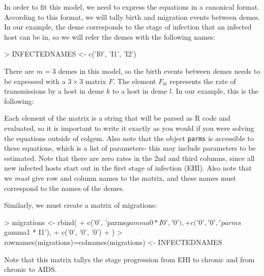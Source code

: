 \documentclass{article}
\begin{document}
In order to fit this model, we need to express the equations in a canonical format. 
According to this format, we will tally birth and migration events between demes. 
In our example, the deme corresponds to the stage of infection that an infected host can be in, so we will refer the demes with the following names:
\begin{Schunk}
\begin{Sinput}
> INFECTEDNAMES <- c('I0', 'I1', 'I2')
\end{Sinput}
\end{Schunk}

There are $m=3$ demes in this model, so the birth events between demes needs to be expressed with a $3\times 3$ matrix $F$. 
The element $F_{kl}$ represents the rate of transmissions by a host in deme $k$ to a host in deme $l$. 
In our example, this is the following:
\begin{Schunk}
\end{Schunk}
Each element of the matrix is a string that will be parsed as R code and evaluated, so it is important to write it exactly as you would if you were solving the equations outside of colgem.
Also note that the object \texttt{parms} is accessible to these equations, which is a list of parameters- this may include parameters to be estimated.
Note that there are zero rates in the 2nd and third columns, since all new infected hosts start out in the first stage of infection (EHI). 
Also note that we \emph{must} give row and column names to the matrix, and these names must correspond to the names of the demes. 

Similarly, we must create a matrix of migrations:
\begin{Schunk}
\begin{Sinput}
> migrations <- rbind(
+   c('0', 'parms$gamma0 * I0', '0'),
+   c('0', '0', 'parms$gamma1 * I1'),
+   c('0', '0', '0')
+ )
> rownames(migrations)=colnames(migrations) <- INFECTEDNAMES
\end{Sinput}
\end{Schunk}
Note that this matrix tallys the stage progression from EHI to chronic and from chronic to AIDS. 
\end{document}
